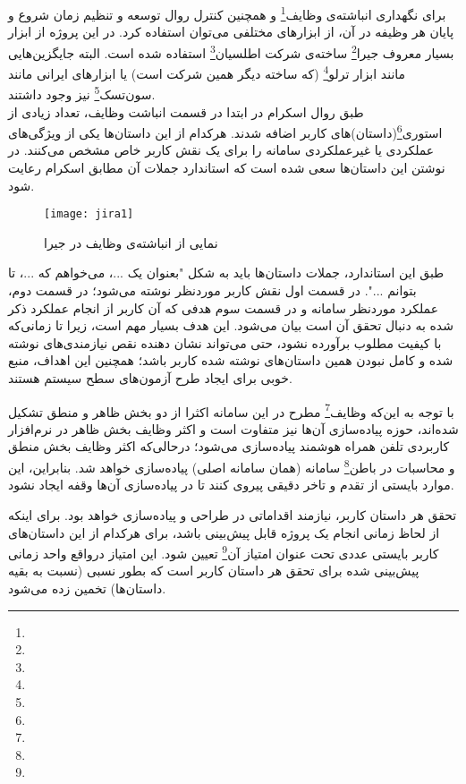 برای نگهداری انباشته‌ی وظایف\footnote{} و همچنین کنترل روال توسعه و تنظیم زمان شروع و پایان هر وظیفه در آن، از ابزارهای مختلفی می‌توان استفاده کرد. در این پروژه از ابزار بسیار معروف جیرا\footnote{} ساخته‌ی شرکت اطلسیان\footnote{} استفاده شده است. البته جایگزین‌هایی مانند ابزار ترلو\footnote{} (که ساخته دیگر همین شرکت است) یا ابزارهای ایرانی مانند سون‌تسک\footnote{} نیز وجود داشتند.\cite{jira}\\

طبق روال اسکرام در ابتدا در قسمت انباشت وظایف،‌ تعداد زیادی از استوری\footnote{}(داستان)های کاربر اضافه شدند. هرکدام از این داستان‌ها یکی از ویژگی‌های عملکردی یا غیرعملکردی سامانه را برای یک نقش کاربر خاص مشخص می‌کنند. در نوشتن این داستان‌ها سعی شده است که استاندارد جملات آن مطابق اسکرام رعایت شود.

\begin{figure}[H]
	\centering
	\texttt{[image: jira1]}
	\caption{نمایی از انباشته‌ی وظایف در جیرا}
	\label{fig:jira1}
\end{figure}

طبق این استاندارد، جملات داستان‌ها باید به شکل "بعنوان یک ...، می‌خواهم که ...، تا بتوانم ...". در قسمت اول نقش کاربر موردنظر نوشته می‌شود؛ در قسمت دوم، عملکرد موردنظر سامانه و در قسمت سوم هدفی که آن کاربر از انجام عملکرد ذکر شده به دنبال تحقق آن است بیان می‌شود. این هدف بسیار مهم است، زیرا تا زمانی‌که با کیفیت مطلوب برآورده نشود، حتی می‌تواند نشان دهنده نقص نیازمندی‌های نوشته شده و کامل نبودن همین داستان‌های نوشته شده کاربر باشد؛ همچنین این اهداف، منبع خوبی برای ایجاد طرح آزمون‌های سطح سیستم هستند.

\newpage

با توجه به این‌که وظایف\footnote{} مطرح در این سامانه اکثرا از دو بخش ظاهر و منطق تشکیل شده‌اند، حوزه پیاده‌سازی آن‌ها نیز متفاوت است و اکثر وظایف بخش ظاهر در نرم‌افزار کاربردی تلفن همراه هوشمند پیاده‌سازی می‌شود؛ درحالی‌که اکثر وظایف بخش منطق و محاسبات در باطن\footnote{} سامانه (همان سامانه اصلی) پیاده‌سازی خواهد شد. بنابراین، این موارد بایستی از تقدم و تاخر دقیقی پیروی کنند تا در پیاده‌سازی آن‌ها وقفه ایجاد نشود.

تحقق هر داستان کاربر، نیازمند اقداماتی در طراحی و پیاده‌سازی خواهد بود. برای اینکه از لحاظ زمانی انجام یک پروژه قابل پیش‌بینی باشد، برای هرکدام از این داستان‌های کاربر بایستی عددی تحت عنوان امتیاز آن\footnote{} تعیین شود. این امتیاز درواقع واحد زمانی پیش‌بینی شده برای تحقق هر داستان کاربر است که بطور نسبی (نسبت به بقیه داستان‌ها) تخمین زده می‌شود. 

